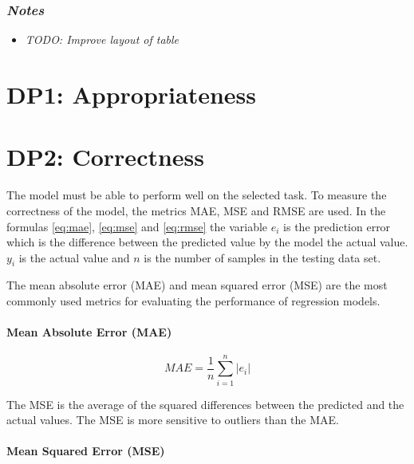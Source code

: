 \subsubsection*{\textit{Notes}}

\begin{itemize}
    \item \textit{TODO: Improve layout of table}
\end{itemize}


\section{DP1: Appropriateness}\label{sec:dp1:-appropriateness}


\section{DP2: Correctness}\label{sec:dp2:-correctness}
The model must be able to perform well on the selected task.
To measure the correctness of the model, the metrics MAE, MSE and RMSE are used.
In the formulas \ref{eq:mae}, \ref{eq:mse} and \ref{eq:rmse} the variable $e_i$ is the prediction
error which is the difference between the predicted value by the model the actual value.
$y_i$ is the actual value and $n$ is the number of samples in the testing data set.

The mean absolute error (MAE) and mean squared error (MSE) are the most commonly used metrics for
evaluating the performance of regression models. \paragraph*{Mean Absolute Error (MAE)}

\begin{equation}
    \label{eq:mae}
    MAE = \frac{1}{n} \sum_{i=1}^{n} |e_i|
\end{equation}

The MSE is the average of the squared differences between the predicted and the actual values.
The MSE is more sensitive to outliers than the MAE.

\paragraph*{Mean Squared Error (MSE)}

